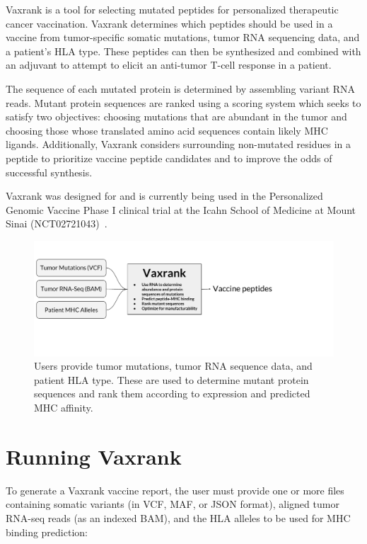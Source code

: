 \documentclass[10pt,letterpaper]{article}
\begin{document}
Vaxrank is a tool for selecting mutated peptides for personalized therapeutic cancer vaccination. Vaxrank determines which peptides should be used in a vaccine from tumor-specific somatic mutations, tumor RNA sequencing data, and a patient's HLA type. These peptides can then be synthesized and combined with an adjuvant to attempt to elicit an anti-tumor T-cell response in a patient.

The sequence of each mutated protein is determined by assembling variant RNA reads. Mutant protein sequences are ranked using a scoring system which seeks to satisfy two objectives: choosing mutations that are abundant in the tumor and choosing those whose translated amino acid sequences contain likely MHC ligands. Additionally, Vaxrank considers surrounding non-mutated residues in a peptide to prioritize vaccine peptide candidates and to improve the odds of successful synthesis.

Vaxrank was designed for and is currently being used in the Personalized Genomic Vaccine Phase I clinical trial at the Icahn School of Medicine at Mount Sinai (NCT02721043)~\citep{pgv-pipeline}.


\begin{figure}
	\includegraphics[scale=0.65, clip, trim=0 110 180 50]{vaxrank_diagram}
	\caption{Users provide tumor mutations, tumor RNA sequence data, and patient HLA type. These are used to determine mutant protein sequences and rank them according to expression and predicted MHC affinity.}
\end{figure}

\section{Running Vaxrank}
To generate a Vaxrank vaccine report, the user must provide one or more files containing somatic variants (in VCF, MAF, or JSON format), aligned tumor RNA-seq reads (as an indexed BAM), and the HLA alleles to be used for MHC binding prediction:
\end{document}
